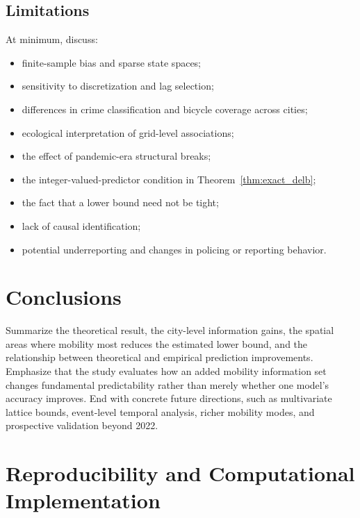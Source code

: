 \documentclass[applsci,article,submit,moreauthors]{Definitions/mdpi}
\begin{document}
\subsection{Limitations}
At minimum, discuss:
\begin{itemize}
    \item finite-sample bias and sparse state spaces;
    \item sensitivity to discretization and lag selection;
    \item differences in crime classification and bicycle coverage across cities;
    \item ecological interpretation of grid-level associations;
    \item the effect of pandemic-era structural breaks;
    \item the integer-valued-predictor condition in Theorem~\ref{thm:exact_delb};
    \item the fact that a lower bound need not be tight;
    \item lack of causal identification;
    \item potential underreporting and changes in policing or reporting behavior.
\end{itemize}

\section{Conclusions}
\label{sec:conclusions}

Summarize the theoretical result, the city-level information gains, the spatial areas where mobility most reduces the estimated lower bound, and the relationship between theoretical and empirical prediction improvements. Emphasize that the study evaluates how an added mobility information set changes fundamental predictability rather than merely whether one model's accuracy improves. End with concrete future directions, such as multivariate lattice bounds, event-level temporal analysis, richer mobility modes, and prospective validation beyond 2022.

\section{Reproducibility and Computational Implementation}
\label{sec:reproducibility}
\end{document}
